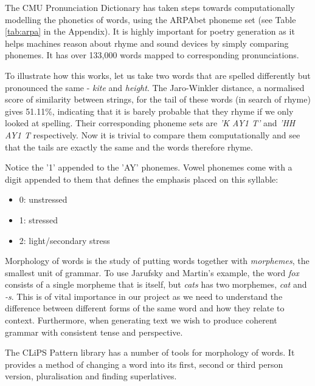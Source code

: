 The CMU Pronunciation Dictionary\cite{weide1998cmu} has taken steps towards computationally modelling the phonetics of words, using the ARPAbet phoneme set (see Table \ref{tab:arpa} in the Appendix). It is highly important for poetry generation as it helps machines reason about rhyme and sound devices by simply comparing phonemes. It has over 133,000 words mapped to corresponding pronunciations.

To illustrate how this works, let us take two words that are spelled differently but pronounced the same - \textit{kite} and \textit{height}. The Jaro-Winkler distance, a normalised score of similarity between strings, for the tail of these words (in search of rhyme) gives 51.11\%, indicating that it is barely probable that they rhyme if we only looked at spelling. Their corresponding phoneme sets are \textit{'K AY1 T'} and \textit{'HH AY1 T} respectively. Now it is trivial to compare them computationally and see that the tails are exactly the same and the words therefore rhyme.

Notice the '1' appended to the 'AY' phonemes. Vowel phonemes come with a digit appended to them that defines the emphasis placed on this syllable:
\begin{itemize}
\item{0: unstressed}
\item{1: stressed}
\item{2: light/secondary stress}
\end{itemize}

Morphology of words is the study of putting words together with \textit{morphemes}, the smallest unit of grammar. To use Jarufsky and Martin's example, the word \textit{fox} consists of a single morpheme that is itself, but \textit{cats} has two morphemes, \textit{cat} and \textit{-s}. This is of vital importance in our project as we need to understand the difference between different forms of the same word and how they relate to context. Furthermore, when generating text we wish to produce coherent grammar with consistent tense and perspective.

The CLiPS Pattern library has a number of tools for morphology of words. It provides a method of changing a word into its first, second or third person version, pluralisation and finding superlatives.\cite{de2012pattern}


